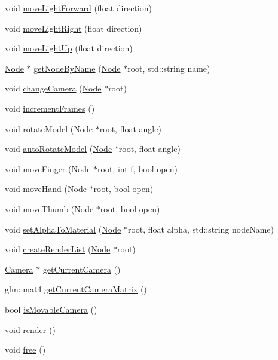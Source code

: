 \begin{DoxyCompactItemize}
void \hyperlink{classEngine_ae001f97b8363dcc657fea6d8fd61bb71}{move\+Light\+Forward} (float direction)
\item 
void \hyperlink{classEngine_a39722483f0ab212c1f240607b79984a8}{move\+Light\+Right} (float direction)
\item 
void \hyperlink{classEngine_a9af1747c316912a33e2300a6a2dd4904}{move\+Light\+Up} (float direction)
\item 
\hyperlink{classNode}{Node} $\ast$ \hyperlink{classEngine_a6897f35a40e6e871ad1badf96f115727}{get\+Node\+By\+Name} (\hyperlink{classNode}{Node} $\ast$root, std\+::string name)
\item 
void \hyperlink{classEngine_a9c29390e49cea40900a48490c8659490}{change\+Camera} (\hyperlink{classNode}{Node} $\ast$root)
\item 
void \hyperlink{classEngine_a1c8aef3cc4613f7c47698653ef6e3931}{increment\+Frames} ()
\item 
void \hyperlink{classEngine_a762a16ea87e60e95bbeff740e29e2ef0}{rotate\+Model} (\hyperlink{classNode}{Node} $\ast$root, float angle)
\item 
void \hyperlink{classEngine_adc57a0ae38c6370f704e4a54439a748f}{auto\+Rotate\+Model} (\hyperlink{classNode}{Node} $\ast$root, float angle)
\item 
void \hyperlink{classEngine_a7254f9eac21e503248c2b935c0a97686}{move\+Finger} (\hyperlink{classNode}{Node} $\ast$root, int f, bool open)
\item 
void \hyperlink{classEngine_a50b326857768af9eb3ba6e806662afed}{move\+Hand} (\hyperlink{classNode}{Node} $\ast$root, bool open)
\item 
void \hyperlink{classEngine_a1189f12688d8c4df96e8e2fd4574e3ea}{move\+Thumb} (\hyperlink{classNode}{Node} $\ast$root, bool open)
\item 
void \hyperlink{classEngine_afe2e714ea154d95366154ee7e5ad76a2}{set\+Alpha\+To\+Material} (\hyperlink{classNode}{Node} $\ast$root, float alpha, std\+::string node\+Name)
\item 
void \hyperlink{classEngine_a148fe7dcd328ef27f766554584bed191}{create\+Render\+List} (\hyperlink{classNode}{Node} $\ast$root)
\item 
\hyperlink{classCamera}{Camera} $\ast$ \hyperlink{classEngine_a28b61944fbc25c2a640c400c0827552e}{get\+Current\+Camera} ()
\item 
glm\+::mat4 \hyperlink{classEngine_a7f476ef9fb9bf0f578e4d6490fd0553a}{get\+Current\+Camera\+Matrix} ()
\item 
bool \hyperlink{classEngine_afcd6a7929f45ee442c5276b6f69d0f75}{is\+Movable\+Camera} ()
\item 
void \hyperlink{classEngine_ab48f7c79b39ed583b0568c381d444944}{render} ()
\item 
void \hyperlink{classEngine_a2dfa731be604b9bf6d3292c464fb1736}{free} ()
\end{DoxyCompactItemize}
